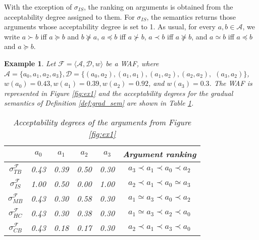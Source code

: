 \documentclass{article}
\newcommand{\AF}{\mathcal{F}}
\newcommand{\A}{\mathcal{A}}
\newcommand{\D}{\mathcal{D}}
\newtheorem{example}{Example}
\begin{document}
With the exception of $\sigma_{IS}$, the ranking on arguments is obtained from the acceptability degree assigned to them. For $\sigma_{IS}$, the semantics returns those arguments whose acceptability degree is set to 1.
%
As usual, for every $a,b \in \A$, we write $a \succ b$ iff $a \succeq b$ and $b \not \succeq a$, $a \preceq b$ iff $a \not \succ b$, $a \prec b$ iff $a \not \succeq b$, and $a \simeq b$ iff $a\preceq b$ and $a \succeq b$. 

\begin{example} \label{ex:semantics}
Let $\AF = \langle \A, \D, w \rangle$ be a WAF, where $\A = \{ a_0, a_1, a_2, a_3 \}, \D = \{ (a_0, a_2),(a_1, a_1),(a_1, a_2),(a_2, a_2),$ $(a_3, a_2) \}$, $w(a_0) = 0.43, w(a_1) = 0.39, w(a_2) = 0.92$, and $w(a_3) = 0.3$. The WAF is represented in Figure \ref{fig:ex1} and the acceptability degrees for the gradual semantics of Definition \ref{def:grad_sem} are shown in Table \ref{tab:ex1}. 

\begin{table}[!h]
    \centering
    \renewcommand{\arraystretch}{1.3}
    \begin{tabular}{|c|c|c|c|c|c|}
    \hline
         & $a_0$& $a_1$& $a_2$& $a_3$& Argument ranking \\
         \hline
         $\sigma^\AF_{TB}$& 0.43 & 0.39 & 0.50 & 0.30 & $a_3 \prec a_1 \prec a_0 \prec a_2$\\
         \hline
         $\sigma^\AF_{IS}$& 1.00 & 0.50 & 0.00 & 1.00 & $a_2 \prec a_1 \prec a_0 \simeq a_3$\\
         \hline
         $\sigma^\AF_{MB}$& 0.43 & 0.30 & 0.58 & 0.30 & $a_1 \simeq a_3 \prec a_0 \prec a_2$\\
         \hline
         $\sigma^\AF_{HC}$& 0.43 & 0.30 & 0.38 & 0.30 & $ a_1 \simeq a_3 \prec a_2 \prec a_0$\\
         \hline
         $\sigma^\AF_{CB}$& 0.43 & 0.18 & 0.17 & 0.30 & $ a_2 \prec a_1 \prec a_3 \prec a_0$\\
         \hline
    \end{tabular}
    \caption{Acceptability degrees of the arguments from Figure \ref{fig:ex1}}
    \label{tab:ex1}
\end{table}

\begin{figure}
\centering
{}
\end{figure}
\end{example}
\end{document}
